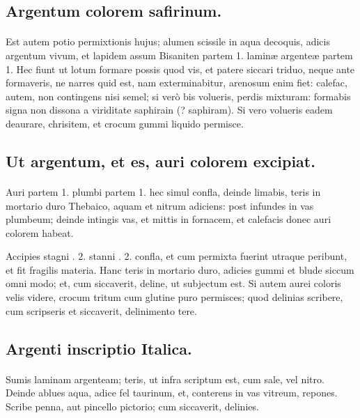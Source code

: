 \documentclass[a4paper, 11pt, oneside, polutonikogreek, italian]{article}
\begin{document}
\subsection{Argentum colorem safirinum.}
\paragraph{}
Est autem potio permixtionis hujus; alumen scissile in aqua decoquis, adicis argentum vivum, et lapidem assum Bisaniten partem 1. laminæ argenteæ partem 1. Hec fiunt ut lotum formare possis quod vis, et patere siccari triduo, neque ante formaveris, ne narres quid est, nam exterminabitur, arenosum enim fiet: calefac, autem, non contingens nisi semel; si verò bis volueris, perdis mixturam: formabis signa non dissona a viriditate saphirain (? saphiram). Si vero volueris eadem deaurare, chrisitem, et crocum gummi liquido permisce.

\subsection{Ut argentum, et es, auri colorem excipiat.}
\paragraph{}
Auri partem 1. plumbi partem 1. hec simul confla, deinde limabis, teris in mortario duro Thebaico, aquam et nitrum adiciens: post infundes in vas plumbeum; deinde intingis vas, et mittis in fornacem, et calefacis donec auri colorem habeat.

Accipies stagni \roundz. 2. stanni \roundz. 2. confla, et cum permixta fuerint utraque peribunt, et fit fragilis materia. Hanc teris in mortario duro, adicies gummi et blude siccum omni modo; et, cum siccaverit, deline, ut subjectum est. Si autem aurei coloris velis videre, crocum tritum cum glutine puro permisces; quod delinias scribere, cum scripseris et siccaverit, delinimento tere.

\subsection{Argenti inscriptio Italica.}
\paragraph{}
Sumis laminam argenteam; teris, ut infra scriptum est, cum sale, vel nitro. Deinde ablues aqua, adice fel taurinum, et, conterens in vas vitreum, repones. Scribe penna, aut pincello pictorio; cum siccaverit, delinies.
\end{document}
